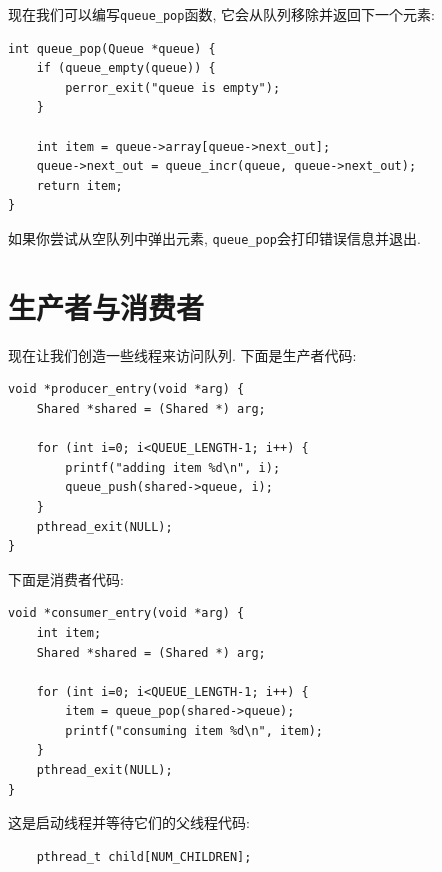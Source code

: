 \documentclass[12pt]{book}
\begin{document}
{现在我们可以编写\verb"queue_pop"函数, 它会从队列移除并返回下一个元素:

\begin{verbatim}
int queue_pop(Queue *queue) {
    if (queue_empty(queue)) {
        perror_exit("queue is empty");
    }
  
    int item = queue->array[queue->next_out];
    queue->next_out = queue_incr(queue, queue->next_out);
    return item;
}
\end{verbatim}

如果你尝试从空队列中弹出元素, \verb"queue_pop"会打印错误信息并退出.


\section{生产者与消费者}
\label{prodcon}

现在让我们创造一些线程来访问队列. 
下面是生产者代码:

\begin{verbatim}
void *producer_entry(void *arg) {
    Shared *shared = (Shared *) arg;

    for (int i=0; i<QUEUE_LENGTH-1; i++) {
        printf("adding item %d\n", i);
        queue_push(shared->queue, i);
    }
    pthread_exit(NULL);
}
\end{verbatim}

下面是消费者代码:

\begin{verbatim}
void *consumer_entry(void *arg) {
    int item;
    Shared *shared = (Shared *) arg;

    for (int i=0; i<QUEUE_LENGTH-1; i++) {
        item = queue_pop(shared->queue);
        printf("consuming item %d\n", item);
    }
    pthread_exit(NULL);
}
\end{verbatim}

这是启动线程并等待它们的父线程代码:

\begin{verbatim}
    pthread_t child[NUM_CHILDREN];


\end{verbatim}}
\end{document}

